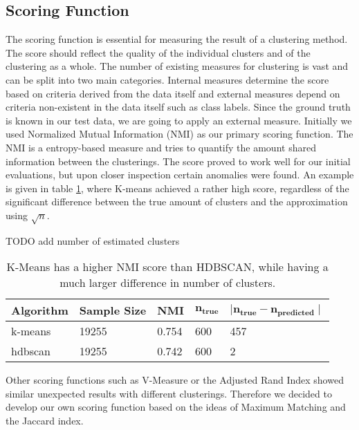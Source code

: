 \subsection{Scoring Function}

The scoring function is essential for measuring the result of a clustering method. The score should reflect the quality of the individual clusters and of the clustering as a whole. The number of existing measures for clustering is vast and can be split into two main categories. Internal measures determine the score based on criteria derived from the data itself and external measures depend on criteria non-existent in the data itself such as class labels. Since the ground truth is known in our test data, we are going to apply an external measure.
Initially we used Normalized Mutual Information (NMI) as our primary scoring function. The NMI is a entropy-based measure and tries to quantify the amount shared information between the clusterings. The score proved to work well for our initial evaluations, but upon closer inspection certain anomalies were found. An example is given in table \ref{tab:nmi_kmeans_example}, where K-means achieved a rather high score, regardless of the significant difference between the true amount of clusters and the approximation using $\sqrt{n}$.


TODO add number of estimated clusters
\begin{table}[h]
    \centering
    \begin{tabular}{|l|l|l|l|l|}
    \hline
    \textbf{Algorithm} & \textbf{Sample Size} & \textbf{NMI}  & $\mathbf{n_{true}}$ & $\mathbf{ \mid n_{true} - n_{predicted} \mid }$ \\ \hline
    k-means & 19255 & 0.754 & 600 & 457 \\ \hline
    hdbscan & 19255 & 0.742 & 600 & 2 \\ \hline
    \end{tabular}
    \caption{K-Means has a higher NMI score than HDBSCAN, while having a much larger difference in number of clusters.}
    \label{tab:nmi_kmeans_example}
\end{table}

Other scoring functions such as V-Measure or the Adjusted Rand Index showed similar unexpected results with different clusterings. Therefore we decided to develop our own scoring function based on the ideas of Maximum Matching and the Jaccard index.

